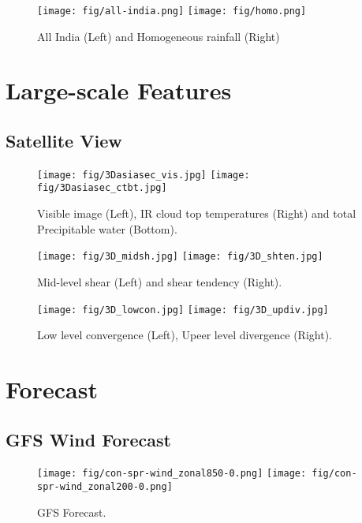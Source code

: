 \documentclass[10pt,a4paper]{article} %
\begin{document}
\begin{figure}[H]
\centering
\texttt{[image: fig/all-india.png]}
\texttt{[image: fig/homo.png]}
\caption{All India  (Left) and Homogeneous rainfall (Right)}
\end{figure}


\section{Large-scale Features}


\subsection{Satellite View}

\begin{figure}[H]
\centering
\texttt{[image: fig/3Dasiasec\_vis.jpg]}
\texttt{[image: fig/3Dasiasec\_ctbt.jpg]}\\
\caption{Visible image (Left), IR cloud top temperatures (Right) and total Precipitable water (Bottom).}
\end{figure}

\begin{figure}[H]
\centering
\texttt{[image: fig/3D\_midsh.jpg]}
\texttt{[image: fig/3D\_shten.jpg]}
\caption{Mid-level shear (Left) and shear tendency (Right).}
\end{figure}


\begin{figure}[H]
\centering
\texttt{[image: fig/3D\_lowcon.jpg]}
\texttt{[image: fig/3D\_updiv.jpg]}

\caption{Low level convergence (Left), Upeer level divergence  (Right).}
\end{figure}

\section{Forecast}
\subsection{GFS Wind Forecast}

\begin{figure}[H]
\centering
\texttt{[image: fig/con-spr-wind\_zonal850-0.png]}
\texttt{[image: fig/con-spr-wind\_zonal200-0.png]}
\caption{GFS Forecast.}
\end{figure}
\end{document}
